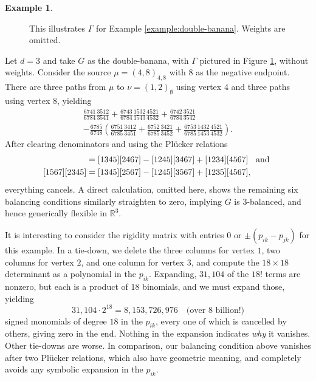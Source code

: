 \documentclass[11pt,letterpaper]{amsart}
\theoremstyle{definition}
\newtheorem{example}{Example}
\begin{document}
\begin{example}
\begin{figure}[!ht]
{}
\caption{This illustrates $\Gamma$ for Example \ref{example:double-banana}. Weights are omitted.}
\label{fig:double-banana}
\end{figure}



Let $d=3$ and take $G$ as the double-banana, with $\Gamma$ pictured in Figure \ref{fig:double-banana}, without weights. Consider the source $\mu = (4,8)_{4,8}$ with $8$ as the negative endpoint. There are three paths from $\mu$ to $\nu=(1,2)_\emptyset$ using vertex $4$ and three paths using vertex $8$, yielding 
\begin{multline*}
    \frac{6741}{6784}\frac{3512}{3541} + \frac{6743}{6784}\frac{1532}{1543}\frac{4521}{4532} + \frac{6742}{6784}\frac{3521}{3542} \\
    - \frac{6785}{6748}\left(\frac{6751}{6785}\frac{3412}{3451} + \frac{6752}{6785}\frac{3421}{3452} + \frac{6753}{6785}\frac{1432}{1453}\frac{4521}{4532}\right).
\end{multline*}
After clearing denominators and using the Pl\"ucker relations 
\begin{align*}
    [1467][2345] &= [1345][2467] - [1245][3467] + [1234][4567] \hspace{0.2cm} \text{ and }\\
    [1567][2345] &= [1345][2567] - [1245][3567] + [1235][4567],
\end{align*}
everything cancels. A direct calculation, omitted here, shows the remaining six balancing conditions similarly straighten to zero, implying $G$ is $3$-balanced, and hence generically flexible in $\mathbb{R}^3$.

It is interesting to consider the rigidity matrix with entries $0$ or $\pm (p_{ik} - p_{jk})$ for this example. In a tie-down, we delete the three columns for vertex $1$, two columns for vertex $2$, and one column for vertex $3$, and compute the $18 \times 18$ determinant as a polynomial in the $p_{ik}$. Expanding, $31,104$ of the $18!$ terms are nonzero, but each is a product of $18$ binomials, and we must expand those, yielding
\begin{equation*}
    31,104 \cdot 2^{18} = 8,153,726,976 \quad (\text{over 8 billion!)}
\end{equation*}
signed monomials of degree $18$ in the $p_{ik}$, every one of which is cancelled by others, giving zero in the end. Nothing in the expansion indicates \textit{why} it vanishes. Other tie-downs are worse. In comparison, our balancing condition above vanishes after two Pl\"ucker relations, which also have geometric meaning, and completely avoids any symbolic expansion in the $p_{ik}$. 


\end{example}
\end{document}
